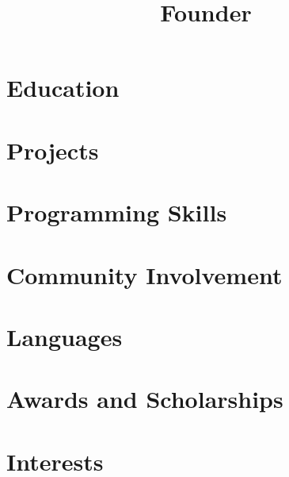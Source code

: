 \documentclass[11pt,a4paper,roman,unicode]{moderncv}
\title{ Founder}
\begin{document}
\maketitle

\section{Education}

\section{Projects}

\section{Programming Skills}

\section{Community Involvement}

\section{Languages}

\section{Awards and Scholarships}

\section{Interests}
\end{document}
